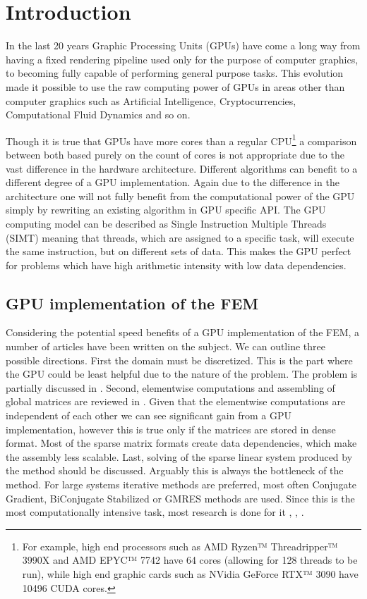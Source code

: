 \chapter{Introduction}
In the last 20 years Graphic Processing Units (GPUs) have come a long way from having a fixed rendering pipeline used only for the purpose of computer graphics, to becoming fully capable of performing general purpose tasks. This evolution made it possible to use the raw computing power of GPUs in areas other than computer graphics such as Artificial Intelligence, Cryptocurrencies, Computational Fluid Dynamics and so on.

Though it is true that GPUs have more cores than a regular CPU\footnote{For example, high end processors such as AMD Ryzen™ Threadripper™ 3990X and AMD EPYC™ 7742 have 64 cores (allowing for 128 threads to be run), while high end graphic cards such as NVidia GeForce RTX™ 3090 have 10496 CUDA cores.} a comparison between both based purely on the count of cores is not appropriate due to the vast difference in the hardware architecture. Different algorithms can benefit to a different degree of a GPU implementation. Again due to the difference in the architecture one will not fully benefit from the computational power of the GPU simply by rewriting an existing algorithm in GPU specific API. The GPU computing model can be described as Single Instruction Multiple Threads (SIMT) meaning that threads, which are assigned to a specific task, will execute the same instruction, but on different sets of data. This makes the GPU perfect for problems which have high arithmetic intensity with low data dependencies.

\section{GPU implementation of the FEM}
Considering the potential speed benefits of a GPU implementation of the FEM, a number of articles have been written on the subject. We can outline three possible directions. First the domain must be discretized. This is the part where the GPU could be least helpful due to the nature of the problem. The problem is partially discussed in \cite{meshing}. Second, elementwise computations and assembling of global matrices are reviewed in \cite{assembling}. Given that the elementwise computations are independent of each other we can see significant gain from a GPU implementation, however this is true only if the matrices are stored in dense format. Most of the sparse matrix formats create data dependencies, which make the assembly less scalable. Last, solving of the sparse linear system produced by the method should be discussed. Arguably this is always the bottleneck of the method. For large systems iterative methods are preferred, most often Conjugate Gradient, BiConjugate Stabilized or GMRES methods are used. Since this is the most computationally intensive task, most research is done for it \cite{sparse-solvers}, \cite{matrix-vector-mult}, \cite{biconjugate}.

